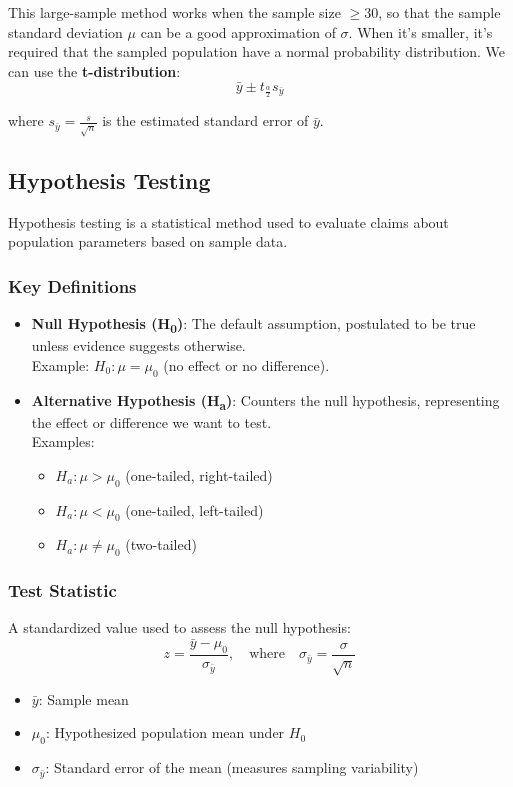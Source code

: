 \documentclass[12pt]{book}
\theoremstyle{definition}
\begin{document}
This large-sample method works when the sample size $\geq 30$, so that the sample standard deviation $\mu$ can be a good approximation of $\sigma$. When it's smaller, it's required that the sampled population have a normal probability distribution. We can use the \textbf{t-distribution}:
\begin{equation}
    \bar{y} \pm t_{\frac{\alpha}{2}} s_{\bar{y}}
\end{equation}

where $s_{\bar{y}} = \frac{s}{\sqrt{n}}$ is the estimated standard error of $\bar{y}$.

\subsection{Hypothesis Testing}
\label{subsec:hypothesis_testing}

Hypothesis testing is a statistical method used to evaluate claims about population parameters based on sample data.

\subsubsection*{Key Definitions}
\begin{itemize}
    \item \textbf{Null Hypothesis (H\textsubscript{0})}: The default assumption, postulated to be true unless evidence suggests otherwise. \\
    Example: \( H_0: \mu = \mu_0 \) (no effect or no difference).
    
    \item \textbf{Alternative Hypothesis (H\textsubscript{a})}: Counters the null hypothesis, representing the effect or difference we want to test. \\
    Examples:
    \begin{itemize}
        \item \( H_a: \mu > \mu_0 \) (one-tailed, right-tailed)
        \item \( H_a: \mu < \mu_0 \) (one-tailed, left-tailed)
        \item \( H_a: \mu \neq \mu_0 \) (two-tailed)
    \end{itemize}
\end{itemize}

\subsubsection*{Test Statistic}
A standardized value used to assess the null hypothesis:
\[
z = \frac{\bar{y} - \mu_0}{\sigma_{\bar{y}}}, \quad \text{where} \quad \sigma_{\bar{y}} = \frac{\sigma}{\sqrt{n}}
\]
\begin{itemize}
    \item \(\bar{y}\): Sample mean
    \item \(\mu_0\): Hypothesized population mean under \( H_0 \)
    \item \(\sigma_{\bar{y}}\): Standard error of the mean (measures sampling variability)
\end{itemize}
\end{document}
